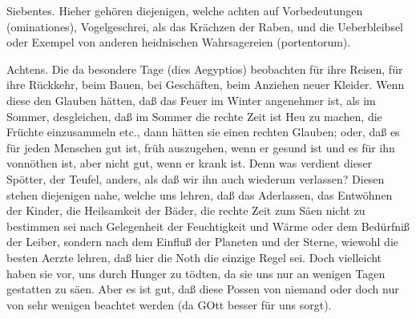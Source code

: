 Siebentes. Hieher gehören diejenigen, welche achten auf Vorbedeutungen (ominationes), Vogelgeschrei, als das Krächzen der Raben, und die Ueberbleibsel oder Exempel von anderen heidnischen Wahrsagereien (portentorum).

Achtens. Die da besondere Tage (dies Aegyptios) beobachten für ihre Reisen, für ihre Rückkehr, beim Bauen, bei Geschäften, beim Anziehen neuer Kleider. Wenn diese den Glauben hätten, daß das Feuer im Winter angenehmer ist, als im Sommer, desgleichen, daß im Sommer die rechte Zeit ist Heu zu machen, die Früchte einzusammeln etc., dann hätten sie einen rechten Glauben; oder, daß es für jeden Menschen gut ist, früh auszugehen, wenn er gesund ist und es für ihn vonnöthen ist, aber nicht gut, wenn er krank ist. Denn was verdient dieser Spötter, der Teufel, anders, als daß wir ihn auch wiederum verlassen? Diesen stehen diejenigen nahe, welche uns lehren, daß das Aderlassen, das Entwöhnen der Kinder, die Heilsamkeit der Bäder, die rechte Zeit zum Säen nicht zu bestimmen sei nach Gelegenheit der Feuchtigkeit und Wärme oder dem Bedürfniß der Leiber, sondern nach dem Einfluß der Planeten und der Sterne, wiewohl die besten Aerzte lehren, daß hier die Noth die einzige Regel sei. Doch vielleicht haben sie vor, uns durch Hunger zu tödten, da sie uns nur an wenigen Tagen gestatten zu säen. Aber es ist gut, daß diese Possen von niemand oder doch nur von sehr wenigen beachtet werden (da GOtt besser für uns sorgt).

